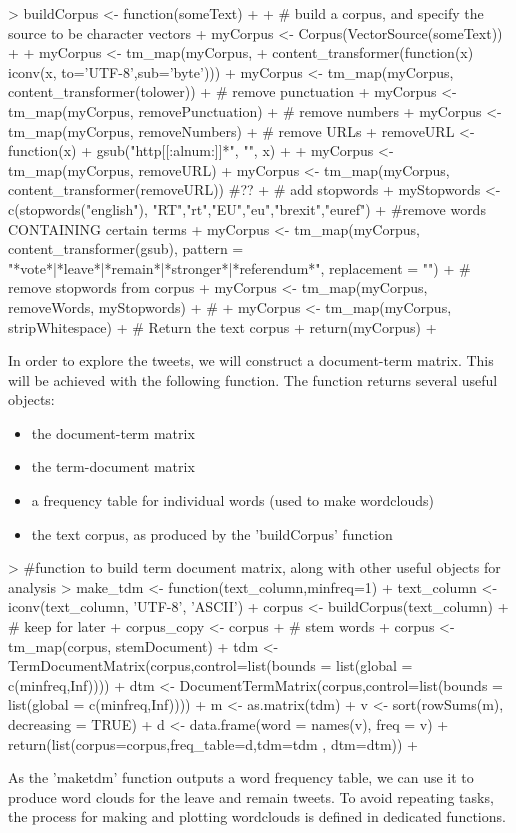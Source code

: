 \documentclass[10pt]{article}
\begin{document}
\begin{Schunk}
\begin{Sinput}
> buildCorpus <- function(someText){
+   
+   # build a corpus, and specify the source to be character vectors
+   myCorpus <- Corpus(VectorSource(someText))
+ 
+   myCorpus <- tm_map(myCorpus,
+                      content_transformer(function(x) iconv(x, to='UTF-8',sub='byte')))
+   myCorpus <- tm_map(myCorpus, content_transformer(tolower))
+   # remove punctuation
+   myCorpus <- tm_map(myCorpus, removePunctuation)
+   # remove numbers
+   myCorpus <- tm_map(myCorpus, removeNumbers)
+   # remove URLs
+   removeURL <- function(x) {
+     gsub("http[[:alnum:]]*", "", x)
+   }
+   myCorpus <- tm_map(myCorpus, removeURL)
+   myCorpus <- tm_map(myCorpus, content_transformer(removeURL)) #??
+   # add stopwords
+   myStopwords <- c(stopwords("english"), "RT","rt","EU","eu","brexit","euref")
+   #remove words CONTAINING certain terms
+   myCorpus <- tm_map(myCorpus, content_transformer(gsub), pattern = "*vote*|*leave*|*remain*|*stronger*|*referendum*", replacement = "")
+   # remove stopwords from corpus
+   myCorpus <- tm_map(myCorpus, removeWords, myStopwords)
+   #
+   myCorpus <- tm_map(myCorpus, stripWhitespace)
+   # Return the text corpus
+   return(myCorpus)
+ }
\end{Sinput}
\end{Schunk}
In order to explore the tweets, we will construct a document-term matrix. This will be achieved with the following function. The function returns several useful objects:
\begin{itemize}
  \item the document-term matrix
  \item the term-document matrix
  \item a frequency table for individual words (used to make wordclouds)
  \item the text corpus, as produced by the 'buildCorpus' function
\end{itemize}

\begin{Schunk}
\begin{Sinput}
> #function to build term document matrix, along with other useful objects for analysis
> make_tdm <- function(text_column,minfreq=1){
+   text_column <- iconv(text_column, 'UTF-8', 'ASCII')
+   corpus <- buildCorpus(text_column)
+   # keep for later
+   corpus_copy <- corpus
+   # stem words
+   corpus <- tm_map(corpus, stemDocument)
+   tdm <- TermDocumentMatrix(corpus,control=list(bounds = list(global = c(minfreq,Inf)))) 
+   dtm <- DocumentTermMatrix(corpus,control=list(bounds = list(global = c(minfreq,Inf)))) 
+   m <- as.matrix(tdm)
+   v <- sort(rowSums(m), decreasing = TRUE)
+   d <- data.frame(word = names(v), freq = v)
+   return(list(corpus=corpus,freq_table=d,tdm=tdm , dtm=dtm))
+ }
\end{Sinput}
\end{Schunk}
As the 'maketdm' function outputs a word frequency table, we can use it to produce word clouds for the leave and remain tweets. To avoid repeating tasks, the process for making and plotting wordclouds is defined in dedicated functions.
\end{document}
